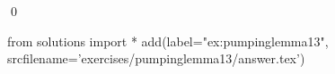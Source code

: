 
\begin{ex} 
  \label{ex:pumpinglemma13}
  
  \qed
\end{ex} 
\begin{python0}
from solutions import *
add(label="ex:pumpinglemma13",
    srcfilename='exercises/pumpinglemma13/answer.tex') 
\end{python0}
